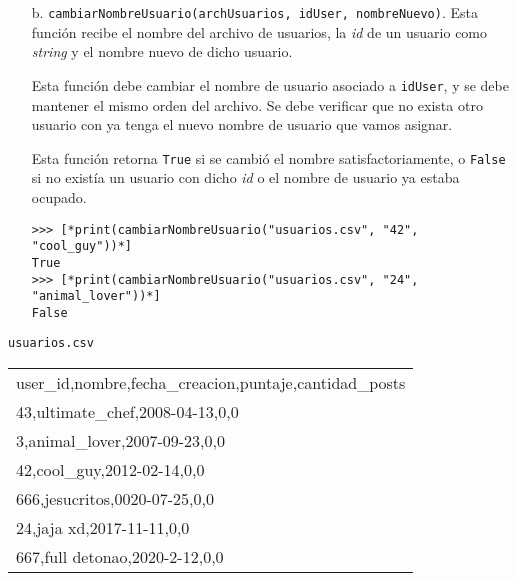 \begin{enumerate}

    \item[b.] \texttt{cambiarNombreUsuario(archUsuarios, idUser, nombreNuevo)}. Esta función recibe el nombre del archivo de usuarios, la \textit{id} de un usuario como \textit{string} y el nombre nuevo de dicho usuario.

    Esta función debe cambiar el nombre de usuario asociado a \texttt{idUser}, y se debe mantener el mismo orden del archivo. Se debe verificar que no exista otro usuario con ya tenga el nuevo nombre de usuario que vamos asignar.
    
    Esta función retorna \texttt{True} si se cambió el nombre satisfactoriamente, o \texttt{False} si no existía un usuario con dicho \textit{id} o el nombre de usuario ya estaba ocupado.

    \begin{lstlisting}[style=consola]
>>> [*print(cambiarNombreUsuario("usuarios.csv", "42", "cool_guy"))*]
True
>>> [*print(cambiarNombreUsuario("usuarios.csv", "24", "animal_lover"))*]
False
    \end{lstlisting}

\end{enumerate}

\begin{center}
    \texttt{usuarios.csv} \\
	\begin{tabular}{|l|}
		\hline
user\_id,nombre,fecha\_creacion,puntaje,cantidad\_posts\\
43,ultimate\_chef,2008-04-13,0,0\\
3,animal\_lover,2007-09-23,0,0\\
42,cool\_guy,2012-02-14,0,0\\
666,jesucritos,0020-07-25,0,0\\
24,jaja xd,2017-11-11,0,0\\
667,full detonao,2020-2-12,0,0 \\
		\hline
	\end{tabular}
\end{center}

